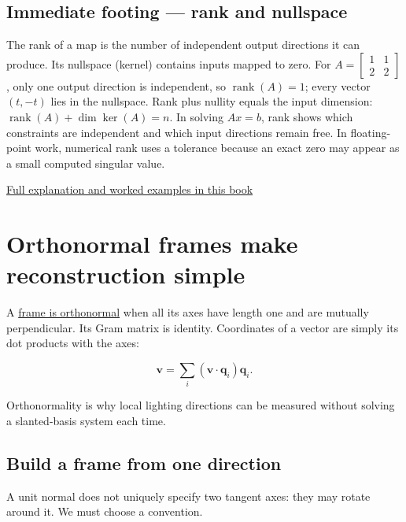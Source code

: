 \subsection{Immediate footing --- rank and nullspace}\label{01-foundations-i-ch017-immediate-footing-rank-and-nullspace}

The rank of a map is the number of independent output directions it can produce. Its nullspace (kernel) contains inputs mapped to zero. For \(A=\begin{bmatrix}1&1\\2&2\end{bmatrix}\), only one output direction is independent, so \(\operatorname{rank}(A)=1\); every vector \((t,-t)\) lies in the nullspace. Rank plus nullity equals the input dimension: \(\operatorname{rank}(A)+\dim\ker(A)=n\). In solving \(Ax=b\), rank shows which constraints are independent and which input directions remain free. In floating-point work, numerical rank uses a tolerance because an exact zero may appear as a small computed singular value.

\hyperref[01-foundations-i-ch019-rank-the-four-spaces-and-the-shape-of-the-answer]{Full explanation and worked examples in this book}

\section{Orthonormal frames make reconstruction simple}\label{01-foundations-i-ch017-orthonormal-frames-make-reconstruction-simple}

A \hyperref[01-foundations-i-ch017-orthonormal-frames-make-reconstruction-simple]{frame is orthonormal} when all its axes have length one and are mutually perpendicular. Its Gram matrix is identity. Coordinates of a vector are simply its dot products with the axes:

\[
\mathbf v=\sum_i(\mathbf v\cdot\mathbf q_i)\mathbf q_i.
\]

Orthonormality is why local lighting directions can be measured without solving a slanted-basis system each time.

\subsection{Build a frame from one direction}\label{01-foundations-i-ch017-build-a-frame-from-one-direction}

A unit normal does not uniquely specify two tangent axes: they may rotate around it. We must choose a convention.

